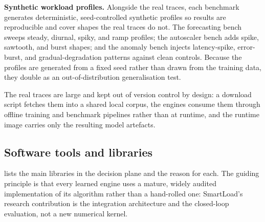 \textbf{Synthetic workload profiles.} Alongside the real traces, each benchmark
generates deterministic, seed-controlled synthetic profiles so results are
reproducible and cover shapes the real traces do not. The forecasting bench
sweeps steady, diurnal, spiky, and ramp profiles; the autoscaler bench adds
spike, sawtooth, and burst shapes; and the anomaly bench injects latency-spike,
error-burst, and gradual-degradation patterns against clean controls. Because the
profiles are generated from a fixed seed rather than drawn from the training data,
they double as an out-of-distribution generalisation test.

The real traces are large and kept out of version control by design: a download
script fetches them into a shared local corpus, the engines consume them through
offline training and benchmark pipelines rather than at runtime, and the runtime
image carries only the resulting model artefacts.

\subsection{Software tools and libraries}\label{imb:libraries}

 lists the main libraries in the decision plane and the
reason for each. The guiding principle is that every learned engine uses a mature,
widely audited implementation of its algorithm rather than a hand-rolled one:
SmartLoad's research contribution is the integration architecture and the
closed-loop evaluation, not a new numerical kernel.

